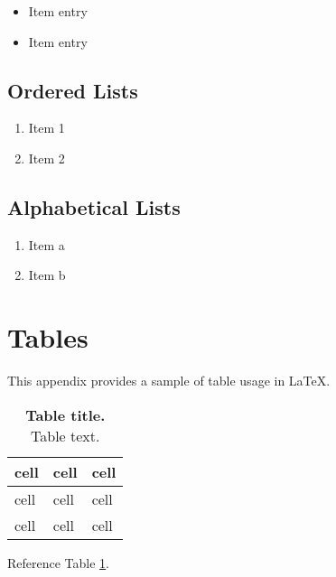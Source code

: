 \begin{itemize}
	\item Item entry
	\item Item entry
\end{itemize}

\subsection{Ordered Lists} \label{ordered-lists}

\begin{enumerate}
	\item Item 1
	\item Item 2
\end{enumerate}

\subsection{Alphabetical Lists} \label{alphabetical-list}

\begin{enumerate}[label=(\alph*)]
	\item Item a
	\item Item b
\end{enumerate}


\section{Tables} \label{tables}

This appendix provides a sample of table usage in LaTeX.

\begin{table}[hb] \centering
\caption{\textbf{Table title.} Table text.}
\label{table:1}
\begin{tabular}{ p{2in} p{2in} p{2in} } 
	\toprule
	
	\textbf{cell} & \textbf{cell} & \textbf{cell} \\ 
	
	\midrule
	
	cell & cell & cell \\ 
	
	\midrule
	
	cell & cell & cell \\
	
	\bottomrule
\end{tabular}
\end{table}

Reference Table \ref{table:1}.
